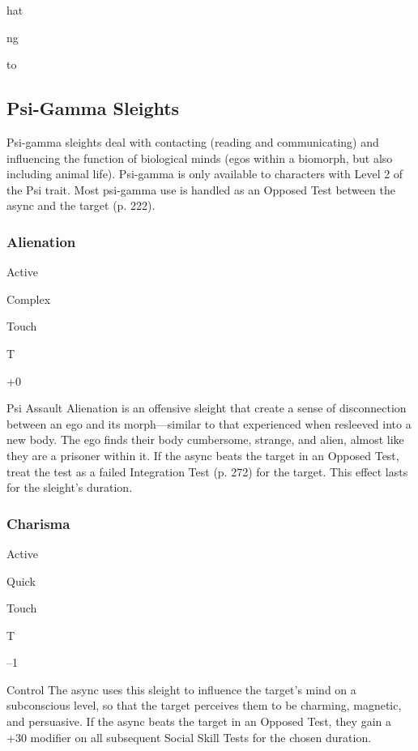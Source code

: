 hat

ng

to 

\subsection{Psi-Gamma Sleights}

Psi-gamma sleights deal with contacting (reading 
and communicating) and influencing the function of 
biological minds (egos within a biomorph, but also 
including animal life). Psi-gamma is only available to 
characters with Level 2 of the Psi trait.
Most psi-gamma use is handled as an Opposed Test 
between the async and the target (p. 222).

\subsubsection{Alienation}


  

Active

   Complex

 Touch

   T

   +0

  

Psi Assault
Alienation is an offensive sleight that create a sense of 
disconnection between an ego and its morph—similar 
to that experienced when resleeved into a new body. 
The ego finds their body cumbersome, strange, and 
alien, almost like they are a prisoner within it. If the 
async beats the target in an Opposed Test, treat the 
test as a failed Integration Test (p. 272) for the target. 
This effect lasts for the sleight's duration.

\subsubsection{Charisma}


  

Active

   Quick

 Touch

   T

   –1

  

Control
The async uses this sleight to influence the target's 
mind on a subconscious level, so that the target perceives
them to be charming, magnetic, and persuasive.
If the async beats the target in an Opposed Test, they 
gain a +30 modifier on all subsequent Social Skill 
Tests for the chosen duration.

